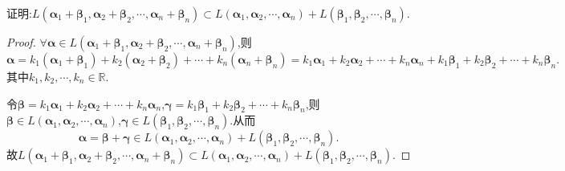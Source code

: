 \documentclass[../../main.tex]{subfiles}
\begin{document}
\begin{proposition}\label{proposition:和空间包含于空间的和}
证明:$L\left( \boldsymbol{\alpha }_1+\boldsymbol{\beta }_1,\boldsymbol{\alpha }_2+\boldsymbol{\beta }_2,\cdots ,\boldsymbol{\alpha }_n+\boldsymbol{\beta }_n \right) \subset L\left( \boldsymbol{\alpha }_1,\boldsymbol{\alpha }_2,\cdots ,\boldsymbol{\alpha }_n \right) +L\left( \boldsymbol{\beta }_1,\boldsymbol{\beta }_2,\cdots ,\boldsymbol{\beta }_n \right)$.
\end{proposition}
\begin{proof}
$\forall \boldsymbol{\alpha }\in L(\boldsymbol{\alpha }_1+\boldsymbol{\beta }_1,\boldsymbol{\alpha }_2+\boldsymbol{\beta }_2,\cdots,\boldsymbol{\alpha }_n+\boldsymbol{\beta }_n)$,则
\[
\boldsymbol{\alpha } = k_1(\boldsymbol{\alpha }_1+\boldsymbol{\beta }_1)+k_2(\boldsymbol{\alpha }_2+\boldsymbol{\beta }_2)+\cdots +k_n(\boldsymbol{\alpha }_n+\boldsymbol{\beta }_n) = k_1\boldsymbol{\alpha }_1 + k_2\boldsymbol{\alpha }_2+\cdots +k_n\boldsymbol{\alpha }_n + k_1\boldsymbol{\beta }_1 + k_2\boldsymbol{\beta }_2+\cdots +k_n\boldsymbol{\beta }_n.
\]
其中$k_1,k_2,\cdots,k_n\in \mathbb{R}$.

令$\boldsymbol{\beta } = k_1\boldsymbol{\alpha }_1 + k_2\boldsymbol{\alpha }_2+\cdots +k_n\boldsymbol{\alpha }_n$,$\boldsymbol{\gamma } = k_1\boldsymbol{\beta }_1 + k_2\boldsymbol{\beta }_2+\cdots +k_n\boldsymbol{\beta }_n$,则$\boldsymbol{\beta }\in L(\boldsymbol{\alpha }_1,\boldsymbol{\alpha }_2,\cdots,\boldsymbol{\alpha }_n)$,$\boldsymbol{\gamma }\in L(\boldsymbol{\beta }_1,\boldsymbol{\beta }_2,\cdots,\boldsymbol{\beta }_n)$.从而
\[
\boldsymbol{\alpha }=\boldsymbol{\beta }+\boldsymbol{\gamma }\in L(\boldsymbol{\alpha }_1,\boldsymbol{\alpha }_2,\cdots,\boldsymbol{\alpha }_n)+L(\boldsymbol{\beta }_1,\boldsymbol{\beta }_2,\cdots,\boldsymbol{\beta }_n).
\]
故$L\left( \boldsymbol{\alpha }_1+\boldsymbol{\beta }_1,\boldsymbol{\alpha }_2+\boldsymbol{\beta }_2,\cdots ,\boldsymbol{\alpha }_n+\boldsymbol{\beta }_n \right) \subset L\left( \boldsymbol{\alpha }_1,\boldsymbol{\alpha }_2,\cdots ,\boldsymbol{\alpha }_n \right) +L\left( \boldsymbol{\beta }_1,\boldsymbol{\beta }_2,\cdots ,\boldsymbol{\beta }_n \right)$.
\end{proof}
\end{document}

